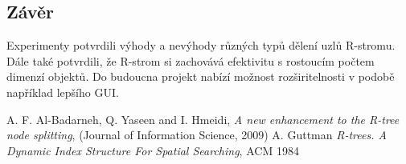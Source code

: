 \documentclass[12pt,a4paper]{article}
\begin{document}
\subsection*{Závěr}
Experimenty potvrdili výhody a nevýhody různých typů dělení uzlů R-stromu. Dále také potvrdili, že R-strom si zachovává efektivitu s rostoucím počtem dimenzí objektů. Do budoucna projekt nabízí možnost rozširitelnosti v podobě například lepšího GUI.


\begin{thebibliography}{9}
 A. F. Al-Badarneh, Q. Yaseen and I. Hmeidi, \textit{A new enhancement to the
R-tree node splitting},
(Journal of Information Science, 2009)
 A. Guttman \textit{R-trees. A Dynamic Index Structure
For Spatial Searching}, ACM 1984
\end{thebibliography}
\end{document}
